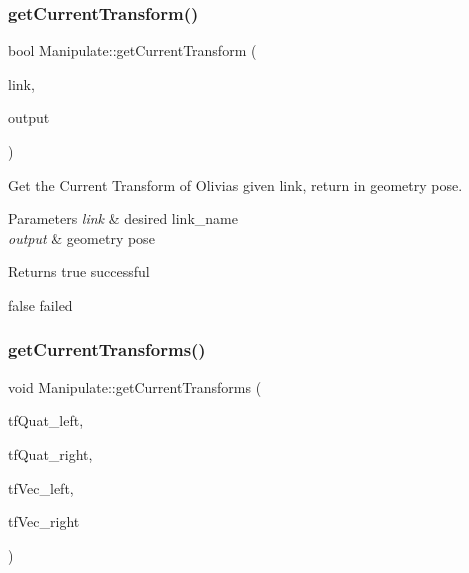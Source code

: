 \subsubsection{\texorpdfstring{get\+Current\+Transform()}{getCurrentTransform()}\hspace{0.1cm}{\footnotesize\ttfamily [2/2]}}
{\footnotesize\ttfamily bool Manipulate\+::get\+Current\+Transform (\begin{DoxyParamCaption}\item[{const std\+::string}]{link,  }\item[{geometry\+\_\+msgs\+::\+Pose\+Stamped \&}]{output }\end{DoxyParamCaption})\hspace{0.3cm}{\ttfamily [private]}}



Get the Current Transform of Olivia\textquotesingle{}s given link, return in geometry pose. 


\begin{DoxyParams}{Parameters}
{\em link} & desired link\+\_\+name \\
\hline
{\em output} & geometry pose \\
\hline
\end{DoxyParams}
\begin{DoxyReturn}{Returns}
true successful 

false failed 
\end{DoxyReturn}
\mbox{\label{structManipulate_a2a7bcfd0f83e32f0c1e98eeef3de195b}} 
\subsubsection{\texorpdfstring{get\+Current\+Transforms()}{getCurrentTransforms()}}
{\footnotesize\ttfamily void Manipulate\+::get\+Current\+Transforms (\begin{DoxyParamCaption}\item[{tf\+::\+Quaternion \&}]{tf\+Quat\+\_\+left,  }\item[{tf\+::\+Quaternion \&}]{tf\+Quat\+\_\+right,  }\item[{tf\+::\+Vector3 \&}]{tf\+Vec\+\_\+left,  }\item[{tf\+::\+Vector3 \&}]{tf\+Vec\+\_\+right }\end{DoxyParamCaption})\hspace{0.3cm}{\ttfamily [private]}}



